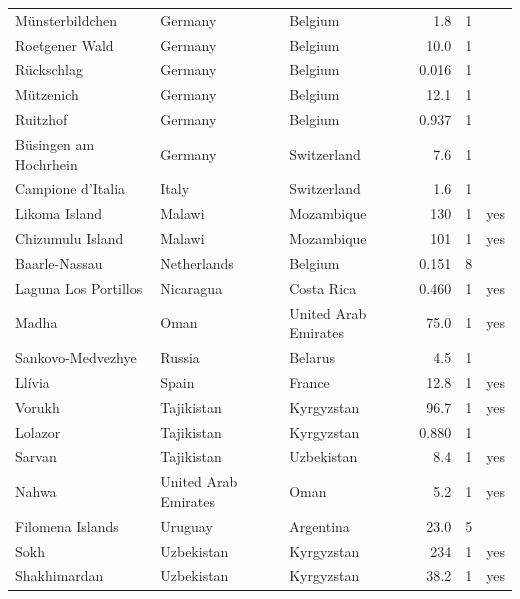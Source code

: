 \documentclass[11pt,a4paper]{article}
\begin{document}
\begin{longtable}{p{4.0cm}p{2.7cm}p{2.9cm}rrr}
Münsterbildchen & Germany & Belgium & 1.8 & 1 & \\
Roetgener Wald & Germany & Belgium & 10.0 & 1 & \\
Rückschlag & Germany & Belgium & 0.016 & 1 & \\
Mützenich & Germany & Belgium & 12.1 & 1 & \\
Ruitzhof & Germany & Belgium & 0.937 & 1 & \\
Büsingen am Hochrhein & Germany & Switzerland & 7.6 & 1 & \\
Campione d'Italia & Italy & Switzerland & 1.6 & 1 & \\
Likoma Island & Malawi & Mozambique & 130 & 1 & yes\\
Chizumulu Island & Malawi & Mozambique & 101 & 1 & yes\\
Baarle-Nassau & Netherlands & Belgium & 0.151 & 8 & \\
Laguna Los Portillos & Nicaragua & Costa Rica & 0.460 & 1 & yes\\
Madha & Oman & United Arab Emirates & 75.0 & 1 & yes\\
Sankovo-Medvezhye & Russia & Belarus & 4.5 & 1 & \\
Llívia & Spain & France & 12.8 & 1 & yes\\
Vorukh & Tajikistan & Kyrgyzstan & 96.7 & 1 & yes\\
Lolazor & Tajikistan & Kyrgyzstan & 0.880 & 1 & \\
Sarvan & Tajikistan & Uzbekistan & 8.4 & 1 & yes\\
Nahwa & United Arab Emirates & Oman & 5.2 & 1 & yes\\
Filomena Islands & Uruguay & Argentina & 23.0 & 5 & \\
Sokh & Uzbekistan & Kyrgyzstan & 234 & 1 & yes\\
Shakhimardan & Uzbekistan & Kyrgyzstan & 38.2 & 1 & yes\\
\bottomrule\end{longtable}
\end{document}
